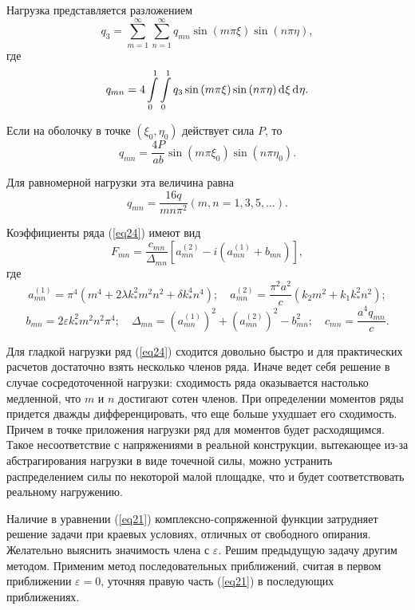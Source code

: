 \documentclass[press]{vestnik}
\begin{document}
Нагрузка представляется разложением
\[
q_{3} =\sum\limits_{m=1}^\infty {\sum\limits_{n=1}^\infty {q_{mn} } } \sin 
\left( {m\pi \xi } \right)\sin \left( {n\pi \eta } \right),
\]
где 
\[
q_{mn} =4\int\limits_0^1 {\int\limits_0^1 {q_{3} \sin \left( {m\pi \xi 
} \right)\sin \left( {n\pi \eta } \right) } } \d\xi \d\eta .
\]

Если на оболочку в точке $\left( {\xi_{0} ,\eta_{0} } \right)$ действует 
сила $P$, то 
\[
q_{mn} =\frac{4P}{ab}\sin \left( {m\pi \xi_{0} } \right)\sin \left( {n\pi 
\eta_{0} } \right).
\]

Для равномерной нагрузки эта величина равна
\[
q_{mn} =\frac{16q}{mn\pi^{2}}\left( {m, n=1, 3, 5, \ldots} \right).
\]

Коэффициенты ряда (\ref{eq24}) имеют вид
\begin{equation}
\label{eq25}
F_{mn} =\frac{c_{mn} }{\Delta_{mn} }\left[ {a_{mn}^{(2)} -i\left( 
{a_{mn}^{(1)} +b_{mn} } \right)} \right],
\end{equation}
где 
\[
a_{mn}^{(1)} =\pi^{4}\left( {m^{4}+2\lambda k_{\ast }^{2} m^{2}n^{2}+\delta k_{\ast }^{4} n^{4}} \right);
\quad
a_{mn}^{(2)} =\frac{\pi ^{2}a^{2}}{c}\left( {k_{2} m^{2}+k_{1} k_{\ast }^{2} n^{2}} \right);
\] 
\[
b_{mn} =2\varepsilon k_{\ast }^{2} m^{2}n^{2}\pi^{4};
\quad
\Delta_{mn} =\left( {a_{mn}^{(1)} } \right)^{2}+\left( {a_{mn}^{(2)} } 
\right)^{2}-b_{mn}^{2} ;
\quad
c_{mn} =\frac{a^{4}q_{mn} }{c}.
\]

Для гладкой нагрузки ряд (\ref{eq24}) сходится довольно быстро и для практических 
расчетов достаточно взять несколько членов ряда. Иначе ведет себя решение в 
случае сосредоточенной нагрузки: сходимость ряда оказывается настолько 
медленной, что $m$ и $n$ достигают сотен членов. При определении моментов 
ряды придется дважды дифференцировать, что еще больше ухудшает его 
сходимость. Причем в точке приложения нагрузки ряд для моментов будет 
расходящимся. Такое несоответствие с напряжениями в реальной конструкции, 
вытекающее из-за абстрагирования нагрузки в виде точечной силы, можно 
устранить распределением силы по некоторой малой площадке, что и будет 
соответствовать реальному нагружению.

Наличие в уравнении (\ref{eq21}) комплексно-сопряженной функции затрудняет решение 
задачи при краевых условиях, отличных от свободного опирания. Желательно 
выяснить значимость члена с $\varepsilon $. Решим предыдущую задачу другим 
методом. Применим метод последовательных приближений, считая в первом 
приближении $\varepsilon =0$, уточняя правую часть (\ref{eq21}) в последующих 
приближениях.
\end{document}
